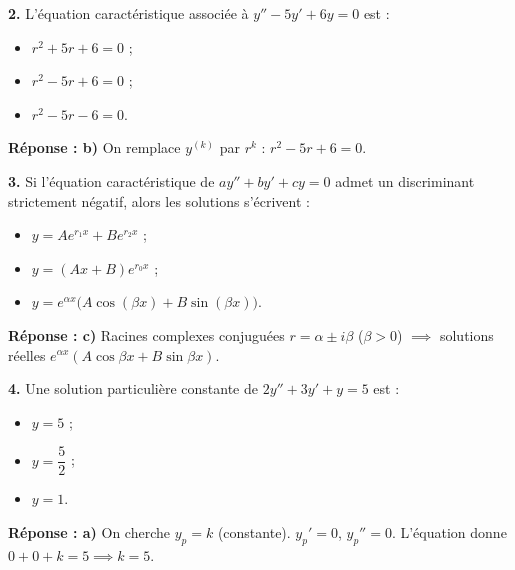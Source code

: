 \documentclass[11pt]{article}
\begin{document}
\begin{exoresolu}
\textbf{2.} L'équation caractéristique associée à $y'' - 5y' + 6y = 0$ est :
\begin{itemize}
\item[a)] $r^2 + 5r + 6 = 0$ ;
\item[b)] $r^2 - 5r + 6 = 0$ ;
\item[c)] $r^2 - 5r - 6 = 0$.
\end{itemize}
\tcblower
\textbf{Réponse : b)} On remplace $y^{(k)}$ par $r^k$ : $r^2 - 5r + 6 = 0$.
\end{exoresolu}

\begin{exoresolu}
\textbf{3.} Si l'équation caractéristique de $ay'' + by' + cy = 0$ admet un discriminant strictement négatif, alors les solutions s'écrivent :
\begin{itemize}
\item[a)] $y = Ae^{r_1 x} + Be^{r_2 x}$ ;
\item[b)] $y = (Ax + B)e^{r_0 x}$ ;
\item[c)] $y = e^{\alpha x}\bigl(A\cos(\beta x) + B\sin(\beta x)\bigr)$.
\end{itemize}
\tcblower
\textbf{Réponse : c)} Racines complexes conjuguées $r = \alpha \pm i\beta$ ($\beta > 0$) $\implies$ solutions réelles $e^{\alpha x}(A\cos\beta x + B\sin\beta x)$.
\end{exoresolu}

\begin{exoresolu}
\textbf{4.} Une solution particulière constante de $2y'' + 3y' + y = 5$ est :
\begin{itemize}
\item[a)] $y = 5$ ;
\item[b)] $y = \dfrac{5}{2}$ ;
\item[c)] $y = 1$.
\end{itemize}
\tcblower
\textbf{Réponse : a)} On cherche $y_p = k$ (constante). $y_p' = 0$, $y_p'' = 0$. L'équation donne $0 + 0 + k = 5 \implies k = 5$.
\end{exoresolu}
\end{document}
